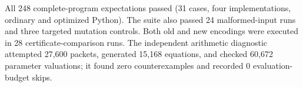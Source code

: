 All 248 complete-program expectations passed (31 cases, four implementations, ordinary and optimized Python). The suite also passed 24 malformed-input runs and three targeted mutation controls. Both old and new encodings were executed in 28 certificate-comparison runs. The independent arithmetic diagnostic attempted 27,600 packets, generated 15,168 equations, and checked 60,672 parameter valuations; it found zero counterexamples and recorded 0 evaluation-budget skips.
